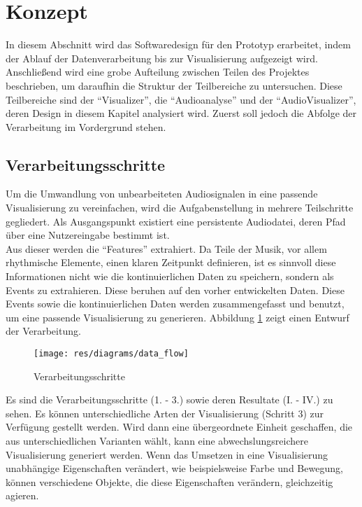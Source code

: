\documentclass[11pt,a4paper]{article}
\begin{document}
\newpage
\section{Konzept}
In diesem Abschnitt wird das Softwaredesign für den Prototyp erarbeitet, indem der Ablauf der Datenverarbeitung bis zur Visualisierung aufgezeigt wird. Anschließend wird eine grobe Aufteilung zwischen Teilen des Projektes beschrieben, um daraufhin die Struktur der Teilbereiche zu untersuchen. Diese Teilbereiche sind der ``Visualizer'', die ``Audioanalyse'' und der ``AudioVisualizer'', deren Design in diesem Kapitel analysiert wird. Zuerst soll jedoch die Abfolge der Verarbeitung im Vordergrund stehen.

\subsection{Verarbeitungsschritte}
Um die Umwandlung von unbearbeiteten Audiosignalen in eine passende Visualisierung zu vereinfachen, wird die Aufgabenstellung in mehrere Teilschritte gegliedert. Als Ausgangspunkt existiert eine persistente Audiodatei, deren Pfad über eine Nutzereingabe bestimmt ist.\\
Aus dieser werden die ``Features'' extrahiert. Da Teile der Musik, vor allem rhythmische Elemente, einen klaren Zeitpunkt definieren, ist es sinnvoll diese Informationen nicht wie die kontinuierlichen Daten zu speichern, sondern als Events zu extrahieren. Diese beruhen auf den vorher entwickelten Daten. Diese Events sowie die kontinuierlichen Daten werden zusammengefasst und benutzt, um eine passende Visualisierung zu generieren. Abbildung \ref{fig:Verarbeitungsschritte} zeigt einen Entwurf der Verarbeitung.
\begin{figure}[ht!]
\centering
\texttt{[image: res/diagrams/data\_flow]}
\caption[Verarbeitungsschritte]{Verarbeitungsschritte}
\label{fig:Verarbeitungsschritte}
\end{figure}

\noindent
Es sind die Verarbeitungsschritte (1. - 3.) sowie deren Resultate (I. - IV.) zu sehen. Es können unterschiedliche Arten der Visualisierung (Schritt 3) zur Verfügung gestellt werden. Wird dann eine übergeordnete Einheit geschaffen, die aus unterschiedlichen Varianten wählt, kann eine abwechslungsreichere Visualisierung generiert werden. Wenn das Umsetzen in eine Visualisierung unabhängige Eigenschaften verändert, wie beispielsweise Farbe und Bewegung, können verschiedene Objekte, die diese Eigenschaften verändern, gleichzeitig agieren.
\end{document}
